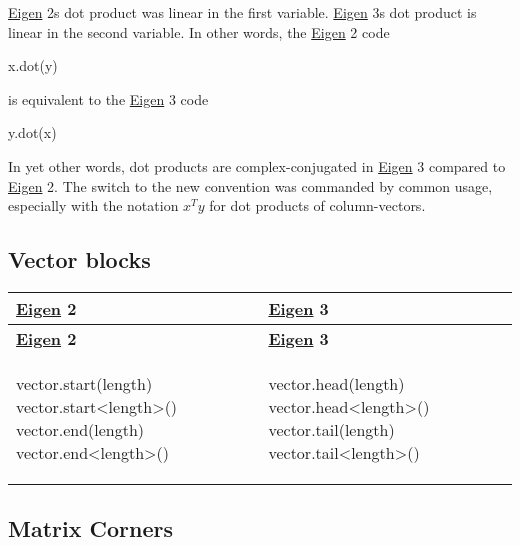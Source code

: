 \hyperlink{namespace_eigen}{Eigen} 2\textquotesingle{}s dot product was linear in the first variable. \hyperlink{namespace_eigen}{Eigen} 3\textquotesingle{}s dot product is linear in the second variable. In other words, the \hyperlink{namespace_eigen}{Eigen} 2 code
\begin{DoxyCode}
x.dot(y) 
\end{DoxyCode}
 is equivalent to the \hyperlink{namespace_eigen}{Eigen} 3 code
\begin{DoxyCode}
y.dot(x) 
\end{DoxyCode}
 In yet other words, dot products are complex-\/conjugated in \hyperlink{namespace_eigen}{Eigen} 3 compared to \hyperlink{namespace_eigen}{Eigen} 2. The switch to the new convention was commanded by common usage, especially with the notation $ x^Ty $ for dot products of column-\/vectors.\hypertarget{_eigen2_to_eigen3_VectorBlocks}{}\subsection{Vector blocks}\label{_eigen2_to_eigen3_VectorBlocks}
\tabulinesep=1mm
\begin{longtabu} spread 0pt [c]{*{2}{|X[-1]}|}
\hline
\rowcolor{\tableheadbgcolor}\textbf{ \hyperlink{namespace_eigen}{Eigen} 2}&\textbf{ \hyperlink{namespace_eigen}{Eigen} 3 }\\
\endfirsthead
\hline
\endfoot
\hline
\rowcolor{\tableheadbgcolor}\textbf{ \hyperlink{namespace_eigen}{Eigen} 2}&\textbf{ \hyperlink{namespace_eigen}{Eigen} 3 }\\
\endhead

\begin{DoxyCode}
vector.start(length)
vector.start<length>()
vector.end(length)
vector.end<length>()
\end{DoxyCode}
&
\begin{DoxyCode}
vector.head(length)
vector.head<length>()
vector.tail(length)
vector.tail<length>()
\end{DoxyCode}
 \\
\end{longtabu}
\hypertarget{_eigen2_to_eigen3_Corners}{}\subsection{Matrix Corners}\label{_eigen2_to_eigen3_Corners}
\tabulinesep=1mm
